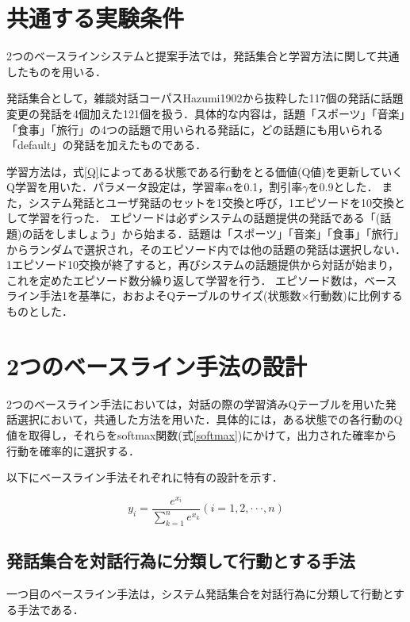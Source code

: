 \documentclass[12pt,a4paper,twoside,openany]{jbook}
\begin{document}
\section{共通する実験条件}\label{jikkenjyoken}
2つのベースラインシステムと提案手法では，発話集合と学習方法に関して共通したものを用いる．

発話集合として，雑談対話コーパスHazumi1902\cite{hazumi}から抜粋した117個の発話に話題変更の発話を4個加えた121個を扱う．具体的な内容は，話題「スポーツ」「音楽」「食事」「旅行」の4つの話題で用いられる発話に，どの話題にも用いられる「default」の発話を加えたものである．

学習方法は，式\ref{Q}によってある状態である行動をとる価値(Q値)を更新していくQ学習を用いた．パラメータ設定は，学習率$\alpha$を0.1，割引率$\gamma$を0.9とした．
また，システム発話とユーザ発話のセットを1交換と呼び，1エピソードを10交換として学習を行った．
エピソードは必ずシステムの話題提供の発話である「(話題)の話をしましょう」から始まる．話題は「スポーツ」「音楽」「食事」「旅行」からランダムで選択され，そのエピソード内では他の話題の発話は選択しない．1エピソード10交換が終了すると，再びシステムの話題提供から対話が始まり，これを定めたエピソード数分繰り返して学習を行う．
エピソード数は，ベースライン手法1を基準に，おおよそQテーブルのサイズ(状態数$\times$行動数)に比例するものとした．



\section{2つのベースライン手法の設計}\label{baseline}

2つのベースライン手法においては，対話の際の学習済みQテーブルを用いた発話選択において，共通した方法を用いた．具体的には，ある状態での各行動のQ値を取得し，それらをsoftmax関数(式\ref{softmax})にかけて，出力された確率から行動を確率的に選択する．

以下にベースライン手法それぞれに特有の設計を示す．

\begin{equation}\label{softmax}
y_i = \frac{e^{x_i}}{\sum_{k=1}^n e^{x_k}}   (i=1,2,\cdot\cdot\cdot,n)
\end{equation}

\subsection{発話集合を対話行為に分類して行動とする手法}
一つ目のベースライン手法は，システム発話集合を対話行為に分類して行動とする手法である．
\end{document}
